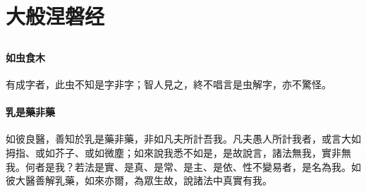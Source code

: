 \section{大般涅磐经}

\subsection{}


\paragraph{如虫食木}
有成字者，此虫不知是字非字；智人見之，終不唱言是虫解字，亦不驚怪。
\paragraph{乳是藥非藥}
如彼良醫，善知於乳是藥非藥，非如凡夫所計吾我。凡夫愚人所計我者，或言大如拇指、或如芥子、或如微塵；如來說我悉不如是，是故說言，諸法無我，實非無我。何者是我？若法是實、是真、是常、是主、是依、性不變易者，是名為我。如彼大醫善解乳藥，如來亦爾，為眾生故，說諸法中真實有我。
